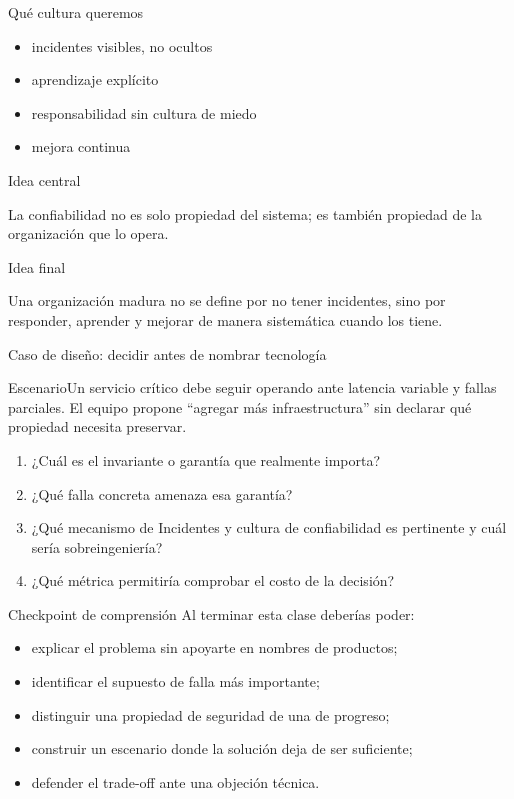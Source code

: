 \documentclass[institutional,screen,none]{ua-engineering-v6-beamer}
\begin{document}

\begin{frame}{Qué cultura queremos}
\begin{itemize}
\item incidentes visibles, no ocultos
\item aprendizaje explícito
\item responsabilidad sin cultura de miedo
\item mejora continua
\end{itemize}
\end{frame}

\begin{frame}{Idea central}
\begin{block}{}
La confiabilidad no es solo propiedad del sistema; es también propiedad de la organización que lo opera.
\end{block}
\end{frame}


\begin{frame}{Idea final}
\begin{block}{}
Una organización madura no se define por no tener incidentes, sino por responder, aprender y mejorar de manera sistemática cuando los tiene.
\end{block}
\end{frame}


\begin{frame}{Caso de diseño: decidir antes de nombrar tecnología}
\small
\begin{block}{Escenario}Un servicio crítico debe seguir operando ante latencia variable y fallas parciales. El equipo propone ``agregar más infraestructura'' sin declarar qué propiedad necesita preservar.\end{block}
\begin{enumerate}
\item ¿Cuál es el invariante o garantía que realmente importa?
\item ¿Qué falla concreta amenaza esa garantía?
\item ¿Qué mecanismo de Incidentes y cultura de confiabilidad es pertinente y cuál sería sobreingeniería?
\item ¿Qué métrica permitiría comprobar el costo de la decisión?
\end{enumerate}
\end{frame}
\begin{frame}{Checkpoint de comprensión}
\small
Al terminar esta clase deberías poder:
\begin{itemize}
\item explicar el problema sin apoyarte en nombres de productos;
\item identificar el supuesto de falla más importante;
\item distinguir una propiedad de seguridad de una de progreso;
\item construir un escenario donde la solución deja de ser suficiente;
\item defender el trade-off ante una objeción técnica.
\end{itemize}
\end{frame}
\end{document}

